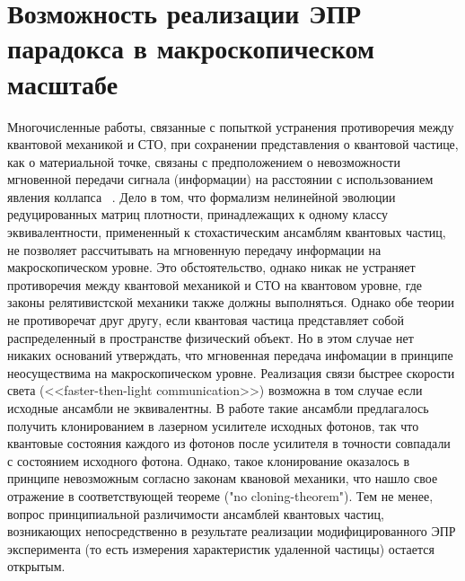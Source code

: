\documentclass[10pt,twoside,book,a5paper]{ncc}
\begin{document}
\section{Возможность реализации ЭПР парадокса в макроскопическом масштабе} 
\label{base-section}

Многочисленные работы, связанные с попыткой устранения противоречия между квантовой механикой и СТО, при сохранении представления о квантовой частице, как о материальной точке, связаны с предположением о невозможности мгновенной передачи сигнала (информации) на расстоянии с использованием явления коллапса ~\cite{sau:4}. Дело в том, что формализм нелинейной эволюции редуцированных матриц плотности, принадлежащих к одному классу эквивалентности, примененный к стохастическим ансамблям квантовых частиц, не позволяет рассчитывать на мгновенную передачу информации на макроскопическом уровне. Это обстоятельство, однако никак не устраняет противоречия между квантовой механикой и СТО на квантовом уровне, где законы релятивистской механики также должны выполняться. Однако обе теории не противоречат друг другу, если квантовая частица представляет собой распределенный в пространстве физический объект. Но в этом случае нет никаких оснований утверждать, что мгновенная передача инфомации в принципе неосуществима на макроскопическом уровне. Реализация связи быстрее скорости света (<<faster-then-light communication>>) возможна в том случае если исходные ансамбли не эквивалентны. В работе \cite{sau:5} такие ансамбли предлагалось получить клонированием в лазерном усилителе исходных фотонов, так что квантовые состояния каждого из фотонов после усилителя в точности совпадали с состоянием исходного фотона. Однако, такое клонирование оказалось в принципе невозможным согласно законам квановой механики, что нашло свое отражение в соответствующей теореме ("no cloning-theorem"). Тем не менее, вопрос принципиальной различимости ансамблей квантовых частиц, возникающих непосредственно в результате реализации модифицированного ЭПР эксперимента (то есть измерения характеристик удаленной частицы) остается открытым.
\end{document}
